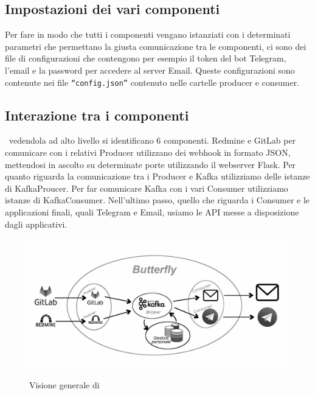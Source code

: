 \subsection{Impostazioni dei vari componenti}

Per fare in modo che tutti i componenti vengano istanziati con i determinati parametri che permettano la giusta comunicazione tra le componenti,
ci sono dei file di configurazioni che contengono per esempio il token del bot Telegram, l'email e la password per accedere al server Email. Queste configurazioni
sono contenute nei file \texttt{``config.json''} contenuto nelle cartelle producer e consumer.

\subsection{Interazione tra i componenti}

\progetto\ vedendola ad alto livello si identificano 6 componenti. Redmine e GitLab per comunicare con i relativi Producer utilizzano dei webhook in formato JSON,
mettendosi in ascolto su determinate porte utilizzando il webserver Flask. Per quanto riguarda la comunicazione tra i Producer e Kafka utilizziamo delle istanze
di KafkaProucer. Per far comunicare Kafka con i vari Consumer utilizziamo istanze di KafkaConsumer. Nell'ultimo passo, quello che riguarda i Consumer e le applicazioni finali, quali Telegram e Email, usiamo le API messe a disposizione dagli applicativi.

\begin{figure}[H]
    \centering
    \includegraphics[width=\textwidth]{img/butterfly.png}\\
    \caption{Visione generale di \progetto}
    \label{fig:butterfly}
\end{figure}
